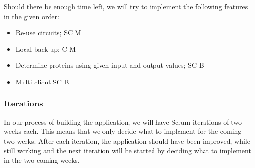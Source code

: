 \documentclass[a4paper]{article}
\begin{document}
Should there be enough time left, we will try to implement the following features in the given order:
\begin{itemize}
\item Re-use circuits;											\tabto{13.8cm} SC \tabto{14.6cm} M
\item Local back-up;											\tabto{13.8cm}  C \tabto{14.6cm} M
\item Determine proteins using given input and output values;	\tabto{13.8cm} SC \tabto{14.6cm} B
\item Multi-client												\tabto{13.8cm} SC \tabto{14.6cm} B
\end{itemize}

\pagebreak
\subsubsection{Iterations}
In our process of building the application, we will have Scrum iterations of two weeks each. This means that we only decide what to implement for the coming two weeks. After each iteration, the application should have been improved, while still working and the next iteration will be started by deciding what to implement in the two coming weeks. \\
\end{document}
